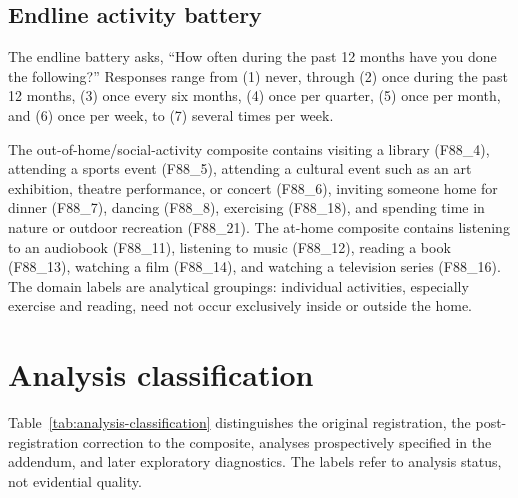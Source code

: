 \documentclass[11pt,a4paper]{article}
\begin{document}
\subsection{Endline activity battery}
The endline battery asks, ``How often during the past 12 months have you done
the following?'' Responses range from (1) never, through (2) once during the
past 12 months, (3) once every six months, (4) once per quarter, (5) once per
month, and (6) once per week, to (7) several times per week.

The out-of-home/social-activity composite contains visiting a library
(F88\_4), attending a sports event (F88\_5), attending a cultural event such as
an art exhibition, theatre performance, or concert (F88\_6), inviting someone
home for dinner (F88\_7), dancing (F88\_8), exercising (F88\_18), and spending
time in nature or outdoor recreation (F88\_21). The at-home composite contains
listening to an audiobook (F88\_11), listening to music (F88\_12), reading a
book (F88\_13), watching a film (F88\_14), and watching a television series
(F88\_16). The domain labels are analytical groupings: individual activities,
especially exercise and reading, need not occur exclusively inside or outside
the home.


\section{Analysis classification}
Table~\ref{tab:analysis-classification} distinguishes the original registration,
the post-registration correction to the composite, analyses prospectively
specified in the addendum, and later exploratory diagnostics. The labels refer
to analysis status, not evidential quality.
\end{document}
